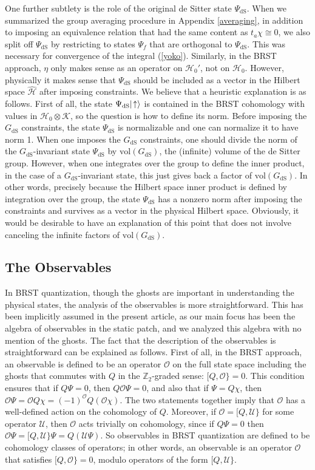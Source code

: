 \documentclass[11pt,a4paper]{article}
\def\h{\widehat}
\def\vol{{\mathrm{vol}}}
\def\O{{\mathcal O}}
\def\K{{\mathcal K}}
\def\U{{\mathcal U}}
\def\Z{{\mathbb Z}}
\def\h{\widehat}
\def\H{{\mathcal H}}
\def\vol{{\mathrm{vol}}}
\def\dS{{\mathrm{dS}}}
\def\ra{\rangle}
\begin{document}
One further subtlety  is the role of the original de Sitter state $\Psi_\dS$.  When we summarized the group averaging procedure in Appendix \ref{averaging},
in addition to imposing an equivalence relation that had the same content as $t_a\chi\cong 0$, we also split off $\Psi_\dS$ by restricting to states $\Psi_f$ that
are orthogonal to $\Psi_\dS$.  This was necessary for convergence of the integral (\ref{yoko}).   Similarly, in the BRST approach, $\eta$ only makes sense
as an operator on $\H_0'$, not on $\H_0$.   However, physically it makes sense that $\Psi_\dS$ should be included as a vector in the Hilbert space
$\h\H$ after imposing constraints.  
We believe that a heuristic explanation is as follows.   First of all,
the state $\Psi_\dS |\negthinspace\uparrow\ra$ is contained in the BRST cohomology with values in $\H_0\otimes \K$, so the question is how to define its norm.
Before imposing the $G_\dS$ constraints, the state $\Psi_\dS$ is normalizable and one can normalize it to have norm 1.
 When one imposes the $G_\dS$ constraints, one should divide the norm of the $G_\dS$-invariant state $\Psi_\dS$ by $\vol(G_\dS)$, the (infinite) volume of
 the de Sitter group. However, when one integrates over the group to define the inner product, in the case of a $G_\dS$-invariant state, this just gives back a
 factor of $\vol(G_\dS)$.   In other words, precisely because the Hilbert space inner product is defined by integration over the group, the state $\Psi_\dS$
 has a nonzero norm after imposing the constraints and survives as a vector in the physical Hilbert space.   Obviously, it would be desirable to have an explanation of this
 point that does not involve canceling the infinite factors of $\vol(G_\dS)$.   

\subsection{The Observables}\label{observables}

In BRST quantization, though the ghosts are important in understanding the physical states, the analysis of the observables
is more straightforward.  This has been implicitly assumed in the present article, as our main focus has been the algebra of observables in the static patch, and
we analyzed this algebra with no mention of the ghosts.  The fact that the description of the observables is straightforward can be explained as follows.
 First of all, in the BRST approach, an observable is defined to be an operator $\O$ on the full state space including the ghosts
  that commutes with $Q$ in the $\Z_2$-graded sense: $[Q,\O\}=0$.   This condition ensures that if $Q\Psi=0$,
then $Q\O\Psi=0$, and also that  if $\Psi=Q\chi$, then $\O\Psi=\O Q\chi =(-1)^{\O} Q(\O\chi)$.   The two statements together imply that $\O$ has a well-defined
action on the cohomology of $Q$.   Moreover, if $\O=[Q,\U\}$ for some operator $\U$, then $\O$ acts trivially on cohomology, since if $Q\Psi=0$ then $\O\Psi=
[Q,\U\}\Psi=Q(\U\Psi)$.   So observables in BRST quantization
are defined to be cohomology classes of operators; in other words, an observable is an operator $\O$ that satisfies $[Q,\O\}=0$, modulo operators of the form
$[Q,\U\}$.   
\end{document}
